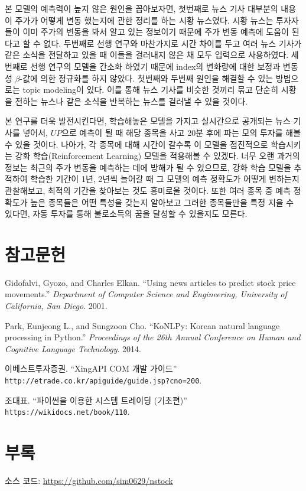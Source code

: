\documentclass[a4paper,10pt]{article}
\begin{document}
본 모델의 예측력이 높지 않은 원인을 꼽아보자면, 첫번째로 뉴스 기사 대부분의 내용이 주가가 어떻게 변동 했는지에 관한 정리를 하는 시황 뉴스였다.
시황 뉴스는 투자자들이 이미 주가의 변동을 봐서 알고 있는 정보이기 때문에 주가 변동 예측에 도움이 된다고 할 수 없다.
두번째로 선행 연구와 마찬가지로 시간 차이를 두고 여러 뉴스 기사가 같은 소식을 전달하고 있을 때 이들을 걸러내지 않은 채 모두 입력으로 사용하였다.
세번째로 선행 연구의 모델을 간소화 하였기 때문에 index의 변화량에 대한 보정과 변동성 $\beta$-값에 의한 정규화를 하지 않았다.
첫번째와 두번째 원인을 해결할 수 있는 방법으로는 topic modeling이 있다.
이를 통해 뉴스 기사를 비슷한 것끼리 묶고 단순히 시황을 전하는 뉴스나 같은 소식을 반복하는 뉴스를 걸러낼 수 있을 것이다.

본 연구를 더욱 발전시킨다면, 학습해놓은 모델을 가지고 실시간으로 공개되는 뉴스 기사를 넣어서,
$UP$으로 예측이 될 때 해당 종목을 사고 20분 후에 파는 모의 투자를 해볼 수 있을 것이다.
나아가, 각 종목에 대해 시간이 갈수록 이 모델을 점진적으로 학습시키는 강화 학습(Reinforcement Learning) 모델을 적용해볼 수 있겠다.
너무 오랜 과거의 정보는 최근의 주가 변동을 예측하는 데에 방해가 될 수 있으므로,
강화 학습 모델을 추적하여 학습한 기간이 1년, 2년씩 늘어갈 때 그 모델의 예측 정확도가 어떻게 변하는지 관찰해보고, 최적의 기간을 찾아보는 것도 흥미로울 것이다.
또한 여러 종목 중 예측 정확도가 높은 종목들은 어떤 특성을 갖는지 알아보고 그러한 종목들만을 특정 지을 수 있다면,
자동 투자를 통해 불로소득의 꿈을 달성할 수 있을지도 모른다.

\section*{참고문헌}

\begin{enumerate}[ {[}1{]} ]
\item Gidofalvi, Gyozo, and Charles Elkan. ``Using news articles to predict stock price movements.'' \textit{Department of Computer Science and Engineering, University of California, San Diego}. 2001.
\item Park, Eunjeong L., and Sungzoon Cho. ``KoNLPy: Korean natural language processing in Python.'' \textit{Proceedings of the 26th Annual Conference on Human and Cognitive Language Technology}. 2014.
\item 이베스트투자증권. ``XingAPI COM 개발 가이드'' \texttt{http://etrade.co.kr/apiguide/guide.jsp?cno=200}.
\item 조대표. ``파이썬을 이용한 시스템 트레이딩 (기초편)'' \texttt{https://wikidocs.net/book/110}.
\end{enumerate}

\section*{부록}

소스 코드: \url{https://github.com/sim0629/nstock}
\end{document}
